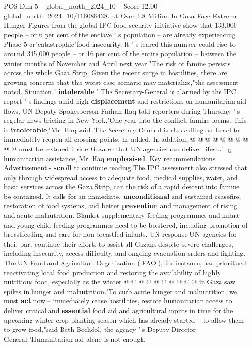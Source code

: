 \begin{textsample}{POS Dim 5 – global\_north\_2024\_10 – Score 12.00 – global\_north\_2024\_10/116086438.txt}  \label{ex:f5_pos_406}
Over 1.8 Million In Gaza Face Extreme Hunger Figures from the global IPC food security initiative show that 133,000 people -- or 6 per cent of the enclave ' s population -- are already experiencing Phase 5 or"catastrophic"food insecurity.
It ' s feared this number could rise to around 345,000 people -- or 16 per cent of the entire population -- between the winter months of November and April next year."The risk of famine persists across the whole Gaza Strip.
Given the recent surge in hostilities, there are growing concerns that this worst-case scenario may materialize,"the assessment noted.
Situation ' \textbf{intolerable} ' The Secretary-General is alarmed by the IPC report ' s findings amid high \textbf{displacement} and restrictions on humanitarian aid flows, UN Deputy Spokesperson Farhan Haq told reporters during Thursday ' s regular news briefing in New York."One year into the conflict, famine looms.
This is \textbf{intolerable},"Mr.
Haq said.
The Secretary-General is also calling on Israel to immediately reopen all crossing points, he added.
In addition, @ @ @ @ @ @ @ @ @ @ must be restored inside Gaza so that UN agencies can deliver lifesaving humanitarian assistance, Mr.
Haq \textbf{emphasised}.
Key recommendations Advertisement - \textbf{scroll} to continue reading The IPC assessment also stressed that only through widespread access to adequate food, medical supplies, water, and basic services across the Gaza Strip, can the risk of a rapid descent into famine be contained.
It calls for an immediate, \textbf{unconditional} and sustained ceasefire, restoration of food systems, and better \textbf{prevention} and management of rising and acute malnutrition.
Blanket supplementary feeding programmes and infant and young child feeding programmes need to be bolstered, including promotion of breastfeeding and care for non-breastfed infants.
UN response UN agencies for their part continue their efforts to assist all Gazans despite severe challenges, including insecurity, access difficulty, and ongoing evacuation orders and fighting.
The UN Food and Agriculture Organization ( FAO ), for instance, has prioritised reactivating local food production and restoring the availability of highly nutritious food, especially as the winter @ @ @ @ @ @ @ @ @ @ in Gaza saw spikes in hunger and malnutrition."To curb acute hunger and malnutrition, we must \textbf{act} now -- immediately cease hostilities, restore humanitarian access to deliver critical and \textbf{essential} food aid and agricultural inputs in time for the upcoming winter crop planting season which has already started -- to allow them to grow food,"said Beth Bechdol, the agency ' s Deputy Director-General."Humanitarian aid alone is not enough.

\end{textsample}
